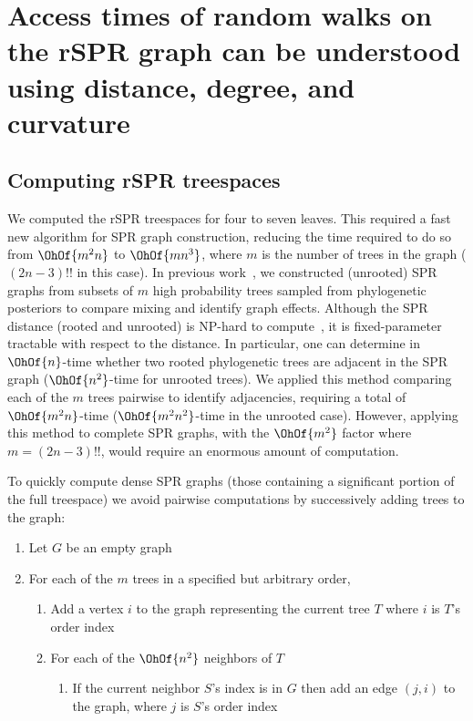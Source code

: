 \documentclass{amsart}
\begin{document}
\section{Access times of random walks on the rSPR graph can be understood using distance, degree, and curvature}

\subsection{Computing rSPR treespaces}

We computed the rSPR treespaces for four to seven leaves.
This required a fast new algorithm for SPR graph construction, reducing the time required to do so from $\OhOf{m^2 n}$ to $\OhOf{mn^3}$, where $m$ is the number of trees in the graph ($(2n-3)!!$ in this case).
In previous work~\cite{Whidden2015-yi}, we constructed (unrooted) SPR graphs from subsets of $m$ high probability trees sampled from phylogenetic posteriors to compare mixing and identify graph effects.
Although the SPR distance (rooted and unrooted) is NP-hard to compute~\cite{bordewich05,hickey2008sdc}, it is fixed-parameter tractable with respect to the distance.
In particular, one can determine in $\OhOf{n}$-time whether two rooted phylogenetic trees are adjacent in the SPR graph ($\OhOf{n^2}$-time for unrooted trees).
We applied this method comparing each of the $m$ trees pairwise to identify adjacencies, requiring a total of $\OhOf{m^2n}$-time ($\OhOf{m^2n^2}$-time in the unrooted case).
However, applying this method to complete SPR graphs, with the $\OhOf{m^2}$ factor where $m = (2n-3)!!$, would require an enormous amount of computation. 

To quickly compute dense SPR graphs (those containing a significant portion of the full treespace) we avoid pairwise computations by successively adding trees to the graph:
\begin{enumerate}[label={\arabic*}.]
	\item Let $G$ be an empty graph
	\item For each of the $m$ trees in a specified but arbitrary order,
		\begin{enumerate}
			\item Add a vertex $i$ to the graph representing the current tree $T$ where $i$ is $T$'s order index
			\item For each of the $\OhOf{n^2}$ neighbors of $T$
				\begin{enumerate}
					\item If the current neighbor $S$'s index is in $G$ then add an edge $(j,i)$ to the graph, where $j$ is $S$'s order index
				\end{enumerate}
		\end{enumerate}
\end{enumerate}
\end{document}
